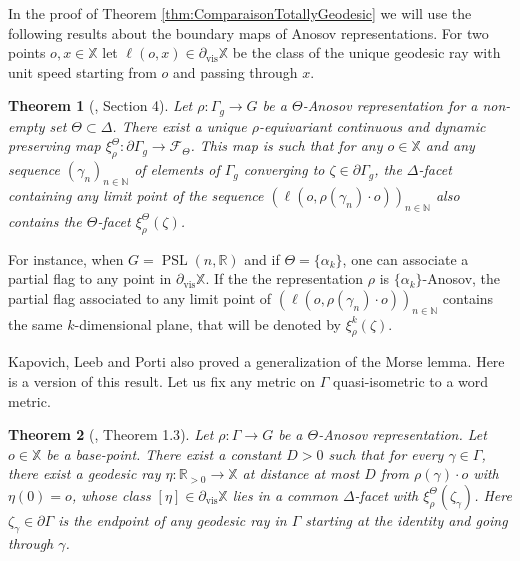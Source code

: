 \documentclass[reqno,10pt]{amsart}
\theoremstyle{plain}
\newtheorem{thm}{Theorem}[section]
\theoremstyle{definition}
\theoremstyle{remark}
\newcommand{\R}{\mathbb{R}}
\newcommand{\N}{\mathbb{N}}
\DeclareMathOperator{\vis}{vis}
\newcommand{\partialvis}{\partial_{\vis}}
\DeclareMathOperator{\PSL}{PSL}
\newcommand{\X}{\mathbb{X}}
\begin{document}
 \medskip
 
In the proof of Theorem \ref{thm:ComparaisonTotallyGeodesic} we will use the following results about the boundary maps of Anosov representations.
For two points $o,x\in \X$ let $\ell(o,x)\in \partialvis \X$ be the class of the unique geodesic ray with unit speed starting from $o$ and passing through $x$.

\begin{thm}[{\cite{BPS}, Section 4}]
\label{thm:AnosovLimitMap}
Let $\rho:\Gamma_g\to G$ be a $\Theta$-Anosov representation for a non-empty set $\Theta\subset \Delta$. There exist a unique $\rho$-equivariant continuous and dynamic preserving map $\xi^\Theta_\rho:\partial\Gamma_g\to \mathcal{F}_\Theta$. 
This map is such that for any $o\in \X$ and any sequence $(\gamma_n)_{n\in \N}$ of elements of $\Gamma_g$ converging to $\zeta\in \partial \Gamma_g$, the $\Delta$-facet containing any limit point of the sequence $(\ell(o, \rho(\gamma_n)\cdot o))_{n\in \N}$ also contains the $\Theta$-facet $\xi^\Theta_\rho(\zeta)$.
\end{thm}

For instance, when $G=\PSL(n,\R)$ and if $\Theta=\lbrace \alpha_k\rbrace$, one can associate a partial flag to any point in $\partialvis \X$. If the the representation $\rho$ is $\lbrace \alpha_k\rbrace$-Anosov, the partial flag associated to any limit point of $(\ell(o, \rho(\gamma_n)\cdot o))_{n\in \N}$ contains the same $k$-dimensional plane, that will be denoted by $\xi^k_\rho(\zeta)$.

\medskip

Kapovich, Leeb and Porti also proved a generalization of the Morse lemma. Here is a version of this result. Let us fix any metric on $\Gamma$ quasi-isometric to a word metric.

\begin{thm}[{\cite{KLPMorse}, Theorem 1.3}]
\label{thm:MorseLemma}
Let $\rho:\Gamma\to G$ be a $\Theta$-Anosov representation. Let $o\in \X$ be a base-point. There exist a constant $D>0$ such that for every $\gamma\in \Gamma$, there exist a geodesic ray $\eta:\R_{>0}\to \X$ at distance at most $D$ from $\rho(\gamma)\cdot o$ with $\eta(0)=o$, whose class $[\eta]\in \partialvis\X$ lies in a common $\Delta$-facet with $\xi^\Theta_\rho(\zeta_\gamma)$. Here $\zeta_\gamma\in \partial \Gamma$ is the endpoint of any geodesic%
ray in $\Gamma$ starting at the identity and going through $\gamma$.
\end{thm}
\end{document}
